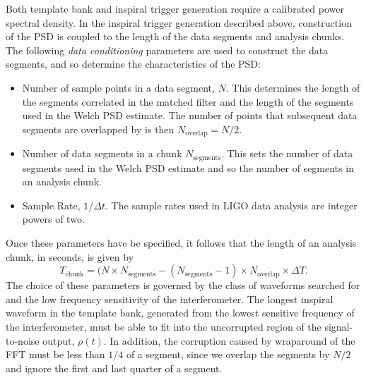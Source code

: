 Both template bank and inspiral trigger generation require a calibrated power
spectral density. In the inspiral trigger generation described above,
construction of the PSD is coupled to the length of the data segments and
analysis chunks. The following \emph{data conditioning} parameters are used to
construct the data segments, and so determine the characteristics of the PSD:
\begin{itemize}
\item Number of sample points in a data segment, $N$. This
determines the length of the segments correlated in the matched filter and the
length of the segments used in the Welch PSD estimate. The number of points
that subsequent data segments are overlapped by is then $N_\mathrm{overlap} =
N/2$.

\item Number of data segments in a chunk $N_\mathrm{segments}$. This sets the
number of data segments used in the Welch PSD estimate and so the number of
segments in an analysis chunk.

\item Sample Rate, $1/\Delta t$. The sample rates used in LIGO data analysis
are integer powers of two.
\end{itemize}
Once these parameters have be specified, it follows that the length of an
analysis chunk, in seconds, is given by
\begin{equation}
T_\mathrm{chunk} = (N \times N_\mathrm{segments} - ( N_\mathrm{segments} - 1 )
\times N_\mathrm{overlap} \times \Delta T.
\end{equation}
The choice of these parameters is governed by the class of waveforms searched
for and the low frequency sensitivity of the interferometer. The longest
inspiral waveform in the template bank, generated from the lowest sensitive
frequency of the interferometer, must be able to fit into the uncorrupted
region of the signal-to-noise output, $\rho(t)$. In addition, the corruption
caused by wraparound of the FFT must be less than $1/4$ of a segment, since we
overlap the segments by $N/2$ and ignore the first and last quarter of a
segment.

